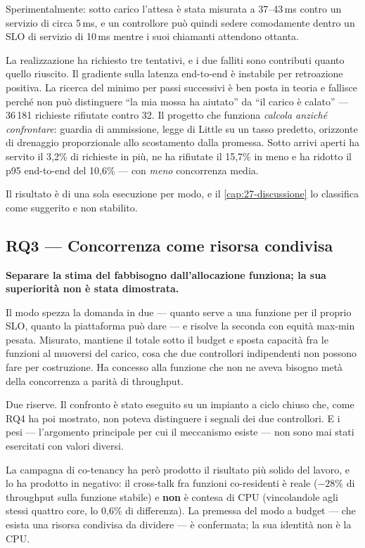 Sperimentalmente: sotto carico l'attesa \`e stata misurata a 37--43\,ms contro un
servizio di circa 5\,ms, e un controllore pu\`o quindi sedere comodamente dentro
un SLO di servizio di 10\,ms mentre i suoi chiamanti attendono ottanta.

La realizzazione ha richiesto tre tentativi, e i due falliti sono contributi
quanto quello riuscito. Il gradiente sulla latenza end-to-end \`e instabile per
retroazione positiva. La ricerca del minimo per passi successivi \`e ben posta in
teoria e fallisce perch\'e non pu\`o distinguere ``la mia mossa ha aiutato'' da
``il carico \`e calato'' --- 36\,181 richieste rifiutate contro 32. Il progetto
che funziona \emph{calcola anzich\'e confrontare}: guardia di ammissione, legge di
Little su un tasso predetto, orizzonte di drenaggio proporzionale allo
scostamento dalla promessa. Sotto arrivi aperti ha servito il 3{,}2\% di
richieste in pi\`u, ne ha rifiutate il 15{,}7\% in meno e ha ridotto il p95
end-to-end del 10{,}6\% --- con \emph{meno} concorrenza media.

Il risultato \`e di una sola esecuzione per modo, e il
\cref{cap:27-discussione} lo classifica come suggerito e non stabilito.

\subsection{RQ3 --- Concorrenza come risorsa condivisa}

\textbf{Separare la stima del fabbisogno dall'allocazione funziona; la sua
superiorit\`a non \`e stata dimostrata.}

Il modo  spezza la domanda in due --- quanto serve a una funzione
per il proprio SLO, quanto la piattaforma pu\`o dare --- e risolve la seconda con
equit\`a max-min pesata. Misurato, mantiene il totale sotto il budget e sposta
capacit\`a fra le funzioni al muoversi del carico, cosa che due controllori
indipendenti non possono fare per costruzione. Ha concesso alla funzione che non
ne aveva bisogno met\`a della concorrenza a parit\`a di throughput.

Due riserve. Il confronto \`e stato eseguito su un impianto a ciclo chiuso che,
come RQ4 ha poi mostrato, non poteva distinguere i segnali dei due controllori.
E i pesi --- l'argomento principale per cui il meccanismo esiste --- non sono mai
stati esercitati con valori diversi.

La campagna di co-tenancy ha per\`o prodotto il risultato pi\`u solido del lavoro,
e lo ha prodotto in negativo: il cross-talk fra funzioni co-residenti \`e reale
($-28\%$ di throughput sulla funzione stabile) e \textbf{non} \`e contesa di CPU
(vincolandole agli stessi quattro core, lo 0{,}6\% di differenza). La premessa
del modo a budget --- che esista una risorsa condivisa da dividere --- \`e
confermata; la sua identit\`a non \`e la CPU.

